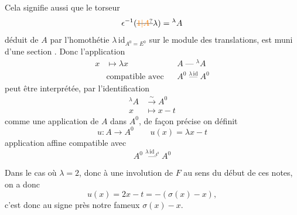 Cela signifie aussi que le torseur
\[
\epsilon^{-1}(\deleted{\unsure{1|A}}\lambda)={}^{\lambda}A
\]
déduit de $A$ par l'homothétie $\lambda\,\mathrm{id}_{A^0=E^0}$
sur le module des translations, est
muni d'une section . Donc
l'application
\[
\begin{aligned}
x&\longmapsto\lambda x && A\mathbin{\text{---}}{}^\lambda A\\
&\text{compatible avec} && A^0\mathrel{\mathop{\text{---}}\limits^{\lambda\,\mathrm{id}}} A^0
\end{aligned}
\]
peut être interprétée, par l'identification
\[
\begin{aligned}
{}^\lambda A&\xrightarrow{\sim}A^0\\
x&\mapsto x-t
\end{aligned}
\]
comme une application de $A$ dans $A^0$,
de façon précise on définit
\[
u:A\longrightarrow A^0\qquad u(x)=\lambda x-t
\]
application affine compatible avec
\[
A^0\mathrel{\mathop{\text{---}}\limits^{\lambda\,\mathrm{id}_{A^0}}}A^0
\]

Dans le cas où $\lambda=2$, donc 
à une involution de $F$ au sens
du début de ces notes, on a donc
\[
u(x)=2x-t=-(\sigma(x)-x),
\]
c'est donc au signe près notre fameux
$\sigma(x)-x$.


